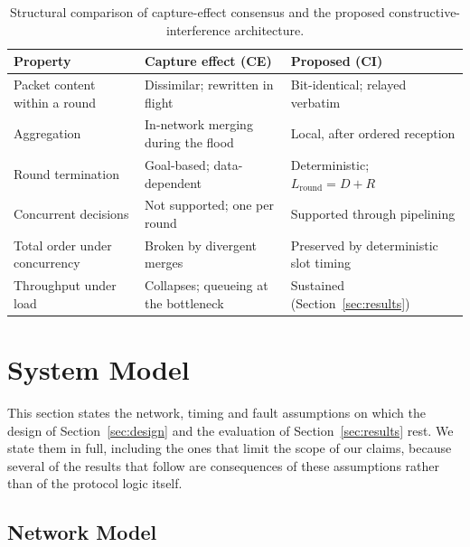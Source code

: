 \documentclass[journal]{IEEEtran}
\newcommand{\CI}{CI}                      %
\newcommand{\CE}{CE}                      %
\newcommand{\Diam}{D}                     %
\newcommand{\Nretx}{R}                    %
\newcommand{\Lround}{L_{\mathrm{round}}}  %
\begin{document}
\begin{table}[!t]
\renewcommand{\arraystretch}{1.25}
\caption{Structural comparison of capture-effect consensus and the
proposed constructive-interference architecture.}
\label{tab:ce-vs-ci}
\centering
\begin{tabular}{@{}p{}p{}p{}@{}}
\toprule
\textbf{Property} & \textbf{Capture effect (\CE)} & \textbf{Proposed (\CI)} \\
\midrule
Packet content within a round &
Dissimilar; rewritten in flight &
Bit-identical; relayed verbatim \\

Aggregation &
In-network merging during the flood &
Local, after ordered reception \\

Round termination &
Goal-based; data-dependent &
Deterministic; $\Lround = \Diam + \Nretx$ \\

Concurrent decisions &
Not supported; one per round &
Supported through pipelining \\

Total order under concurrency &
Broken by divergent merges &
Preserved by deterministic slot timing \\

Throughput under load &
Collapses; queueing at the bottleneck &
Sustained\,(Section~\ref{sec:results}) \\
\bottomrule
\end{tabular}
\end{table}


\section{System Model}
\label{sec:model}
This section states the network, timing and fault assumptions on which the
design of Section~\ref{sec:design} and the evaluation of
Section~\ref{sec:results} rest. We state them in full, including the ones
that limit the scope of our claims, because several of the results that
follow are consequences of these assumptions rather than of the protocol
logic itself.

\subsection{Network Model}
\label{sec:model-network}
\end{document}
